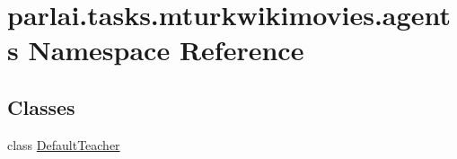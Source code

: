 \hypertarget{namespaceparlai_1_1tasks_1_1mturkwikimovies_1_1agents}{}\section{parlai.\+tasks.\+mturkwikimovies.\+agents Namespace Reference}
\label{namespaceparlai_1_1tasks_1_1mturkwikimovies_1_1agents}
\subsection*{Classes}
\begin{DoxyCompactItemize}
\item 
class \hyperlink{classparlai_1_1tasks_1_1mturkwikimovies_1_1agents_1_1DefaultTeacher}{Default\+Teacher}
\end{DoxyCompactItemize}
